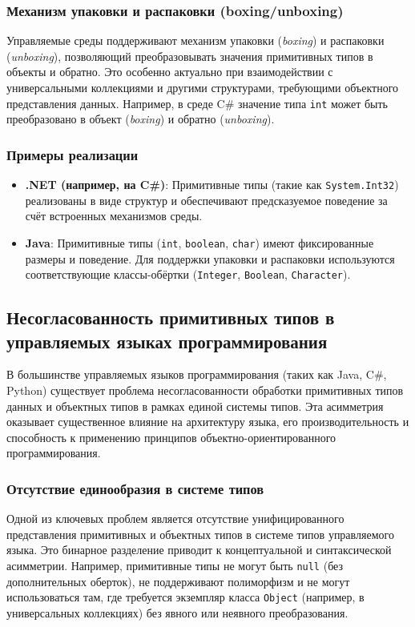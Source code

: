 \subsubsection*{Механизм упаковки и распаковки (boxing/unboxing)}
Управляемые среды поддерживают механизм упаковки (\textit{boxing}) и распаковки (\textit{unboxing}), позволяющий преобразовывать значения примитивных типов в объекты и обратно.
Это особенно актуально при взаимодействии с универсальными коллекциями и другими структурами, требующими объектного представления данных.
Например, в среде C\# значение типа \verb|int| может быть преобразовано в объект (\textit{boxing}) и обратно (\textit{unboxing}).

\subsubsection*{Примеры реализации}
\begin{itemize}
    \item \textbf{.NET (например, на C\#)}: Примитивные типы (такие как \verb|System.Int32|) реализованы в виде структур и обеспечивают предсказуемое поведение за счёт встроенных механизмов среды.
    \item \textbf{Java}: Примитивные типы (\verb|int|, \verb|boolean|, \verb|char|) имеют фиксированные размеры и поведение. Для поддержки упаковки и распаковки используются соответствующие классы-обёртки (\verb|Integer|, \verb|Boolean|, \verb|Character|).
\end{itemize}


\subsection{Несогласованность примитивных типов в управляемых языках программирования}

В большинстве управляемых языков программирования (таких как Java, C\#, Python) существует проблема несогласованности обработки примитивных типов данных и объектных типов в рамках единой системы типов. Эта асимметрия оказывает существенное влияние на архитектуру языка, его производительность и способность к применению принципов объектно-ориентированного программирования.

\subsubsection*{Отсутствие единообразия в системе типов}
Одной из ключевых проблем является отсутствие унифицированного представления примитивных и объектных типов в системе типов управляемого языка.
Это бинарное разделение приводит к концептуальной и синтаксической асимметрии. Например, примитивные типы не могут быть \texttt{null} (без дополнительных оберток), не поддерживают полиморфизм и не могут использоваться там, где требуется экземпляр класса \texttt{Object} (например, в универсальных коллекциях) без явного или неявного преобразования.

